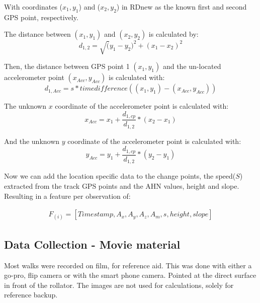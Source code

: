 With coordinates ($x_{1}, y_{1}$) and  ($x_{2}, y_{2}$) in RDnew as the known first and second GPS point, respectively. 

The distance between $(x_{1}, y_{1})$ and $(x_{2}, y_{2})$ is calculated by:
\begin{equation}
d_{1,2} = \sqrt (y_{1}-y_{2})^2 + (x_{1}-x_{2})^2 
\end{equation}

Then, the distance between GPS point 1 $(x_{1}, y_{1})$ and the un-located accelerometer point $(x_{Acc}, y_{Acc})$ is calculated with:
\begin{equation}
d_{1,Acc} = s * time difference((x_{1}, y_{1}) - (x_{Acc}, y_{Acc}))
\end{equation}

The unknown $x$ coordinate of the accelerometer point is calculated with:
\begin{equation}
x_{Acc} = x_{1} +  \frac{d_{1,cp}}{d_{1,2}} * (x_{2} - x_{1})
\end{equation}

And the unknown $y$ coordinate of the accelerometer point is calculated with:
\begin{equation}
y_{Acc} = y_{1} +  \frac{d_{1,cp}}{d_{1,2}} * (y_{2} - y_{1})
\end{equation}

Now we can add the location specific data to the change points, the speed($S$) extracted from the track GPS points and the AHN values, height and slope. Resulting in a feature per observation of:

\begin{multline} 
	F_(i) = [ Time stamp, A_{x}, A_{y}, A_{z}, A_{m}, s, height, slope] 
\end{multline}

\subsection{Data Collection - Movie material}
Most walks were recorded on film, for reference aid. This was done with either a go-pro, flip camera or with the smart phone camera. Pointed at the direct surface in front of the rollator. The images are not used for calculations, solely for reference backup. 


